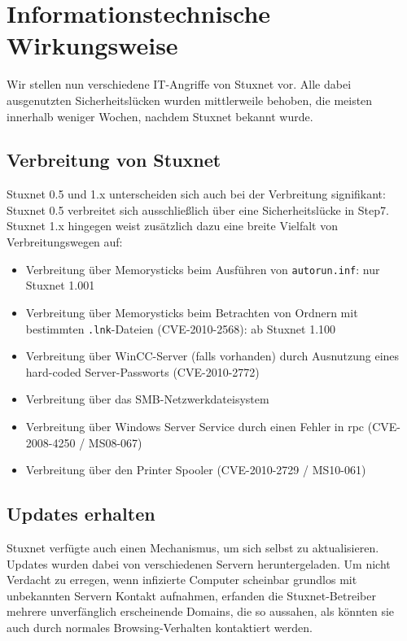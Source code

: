 \documentclass[a4paper]{article}
\begin{document}
\section{Informationstechnische Wirkungsweise}

Wir stellen nun verschiedene IT-Angriffe von Stuxnet vor.
Alle dabei ausgenutzten Sicherheitslücken wurden mittlerweile behoben, die meisten innerhalb weniger Wochen, nachdem Stuxnet bekannt wurde.

\subsection{Verbreitung von Stuxnet}

Stuxnet 0.5 und 1.x unterscheiden sich auch bei der Verbreitung signifikant:
Stuxnet 0.5 verbreitet sich ausschließlich über eine Sicherheitslücke in Step7.
Stuxnet 1.x hingegen weist zusätzlich dazu eine breite Vielfalt von Verbreitungswegen auf:

\begin{itemize}
\item Verbreitung über Memorysticks beim Ausführen von \texttt{autorun.inf}: nur Stuxnet 1.001\cite{dossier} %
\item Verbreitung über Memorysticks beim Betrachten von Ordnern mit bestimmten \texttt{.lnk}-Dateien (CVE-2010-2568\cite{CVE_lnk}): ab Stuxnet 1.100
\item Verbreitung über WinCC-Server (falls vorhanden) durch Ausnutzung eines hard-coded Server-Passworts (CVE-2010-2772\cite{CVE_wincc})
\item Verbreitung über das SMB-Netzwerkdateisystem
\item Verbreitung über Windows Server Service durch einen Fehler in \gls{rpc} (CVE-2008-4250\cite{CVE_rpc} / MS08-067\cite{MS_rpc})
\item Verbreitung über den Printer Spooler (CVE-2010-2729\cite{CVE_spooler} / MS10-061\cite{MS_spooler})
\end{itemize} %

\subsection{Updates erhalten}

Stuxnet verfügte auch einen Mechanismus, um sich selbst zu aktualisieren.
Updates wurden dabei von verschiedenen Servern heruntergeladen.
Um nicht Verdacht zu erregen, wenn infizierte Computer scheinbar grundlos mit unbekannten Servern Kontakt aufnahmen,
erfanden die Stuxnet-Betreiber mehrere unverfänglich erscheinende Domains,
die so aussahen, als könnten sie auch durch normales Browsing-Verhalten kontaktiert werden.
\end{document}
